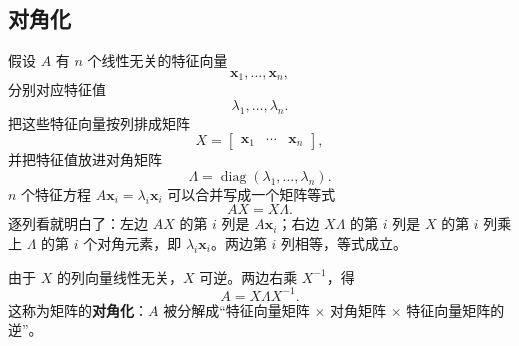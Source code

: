 \documentclass[UTF8,a4paper,12pt]{ctexart}
\numberwithin{equation}{section}
\begin{document}
	\subsection{对角化}

	假设 $A$ 有 $n$ 个线性无关的特征向量
	\begin{equation}\label{eq:7.22}
	\bm{x}_1,\ldots,\bm{x}_n,
	\end{equation}
	分别对应特征值
	\begin{equation}\label{eq:7.23}
	\lambda_1,\ldots,\lambda_n.
	\end{equation}
	把这些特征向量按列排成矩阵
	\begin{equation}\label{eq:7.24}
	X=
	\begin{bmatrix}
		\bm{x}_1&\cdots&\bm{x}_n
	\end{bmatrix},
	\end{equation}
	并把特征值放进对角矩阵
	\begin{equation}\label{eq:7.25}
	\Lambda=
	\operatorname{diag}(\lambda_1,\ldots,\lambda_n).
	\end{equation}
	$n$ 个特征方程 $A\bm{x}_i=\lambda_i\bm{x}_i$ 可以合并写成一个矩阵等式
	\begin{equation}\label{eq:7.26}
	AX=X\Lambda.
	\end{equation}
	逐列看就明白了：左边 $AX$ 的第 $i$ 列是 $A\bm{x}_i$；右边 $X\Lambda$ 的第 $i$ 列是 $X$ 的第 $i$ 列乘上 $\Lambda$ 的第 $i$ 个对角元素，即 $\lambda_i\bm{x}_i$。两边第 $i$ 列相等，等式成立。

	由于 $X$ 的列向量线性无关，$X$ 可逆。两边右乘 $X^{-1}$，得
	\begin{equation}\label{eq:7.27}
	\boxed{A=X\Lambda X^{-1}.}
	\end{equation}
	这称为矩阵的\textbf{对角化}：$A$ 被分解成“特征向量矩阵 $\times$ 对角矩阵 $\times$ 特征向量矩阵的逆”。
\end{document}
